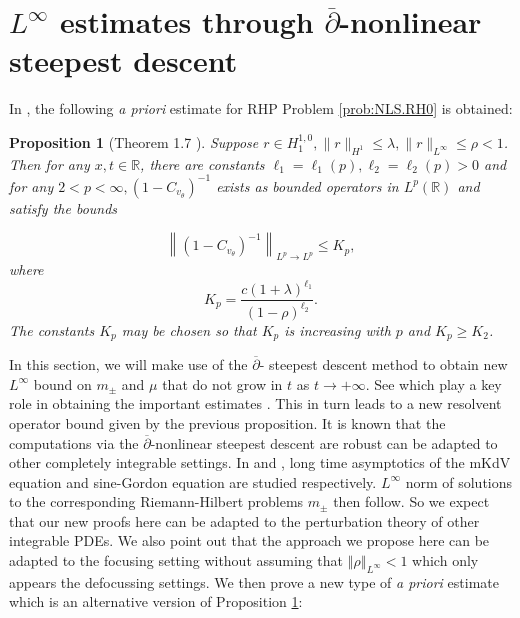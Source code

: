 \documentclass{amsart}
\theoremstyle{plain}
\newtheorem{proposition}[theorem]{Proposition}
\theoremstyle{remark}
\numberwithin{equation}{section}
\newcommand{\norm}[2]{\left\Vert #1\right\Vert_{#2}}
\begin{document}
\section{$L^\infty$ estimates through $\overline{\partial}$-nonlinear steepest descent}
\label{sec:dbar}



In \cite{DZ-1}, the following \textit{a priori} estimate for RHP Problem \ref{prob:NLS.RH0} is obtained:
\begin{proposition}[Theorem 1.7 \cite{DZ-1}]
\label{prop:priori}
 Suppose $r \in H_1^{1,0},\|r\|_{H^{1}} \leqslant \lambda,\|r\|_{L^{\infty}} \leqslant \rho<1$. Then for any $x, t \in \mathbb{R}$,  there are
constants $\ell_1 = \ell_1(p), \ell_2 = \ell_2(p) > 0$ and for any $2<p<\infty,\left(1-C_{v_\theta}\right)^{-1}$  exists as bounded operators in $L^p(\mathbb{R})$ and satisfy the bounds

$$
\left\|\left(1-C_{v_\theta}\right)^{-1}\right\|_{L^p \rightarrow L^p} \leqslant K_p,
$$
where
\begin{equation}
K_p=\frac{c(1+\lambda)^{\ell_1}}{(1-\rho)^{\ell_2}}. 
\end{equation}
The constants $K_p$ may be chosen so that $K_p$ is increasing with $p$ and $K_p \geqslant K_2$.
\end{proposition}
In this section, we will make use of the $\overline{\partial}$- steepest descent method to obtain new $L^\infty$ bound on $m_\pm$ and $\mu$ that do not grow in $t$ as $t\to +\infty$. See \cite[lemma 5.17, 5.23]{DZ-2} which play a key role in obtaining the important estimates \cite[(6.5)-(6.6)]{DZ-2}. This in turn leads to a new resolvent operator bound given by the previous proposition. It is known that the computations via the $\overline{\partial}$-nonlinear steepest descent are robust can be adapted to other completely integrable settings. In \cite{CL} and \cite{CLL}, long time asymptotics of the mKdV equation and sine-Gordon equation are studied respectively. $L^\infty$ norm of solutions to the corresponding Riemann-Hilbert problems $m_\pm$ then follow. So we expect that our new proofs here can be adapted to the perturbation theory of other integrable PDEs.  We also point out that the approach we propose here can be adapted to the focusing setting without assuming that $\norm{\rho}{L^\infty} <1$ which only appears the defocussing settings.  We then prove a new type of \textit{a priori} estimate which is an alternative version of Proposition \ref{prop:priori}:
\end{document}

